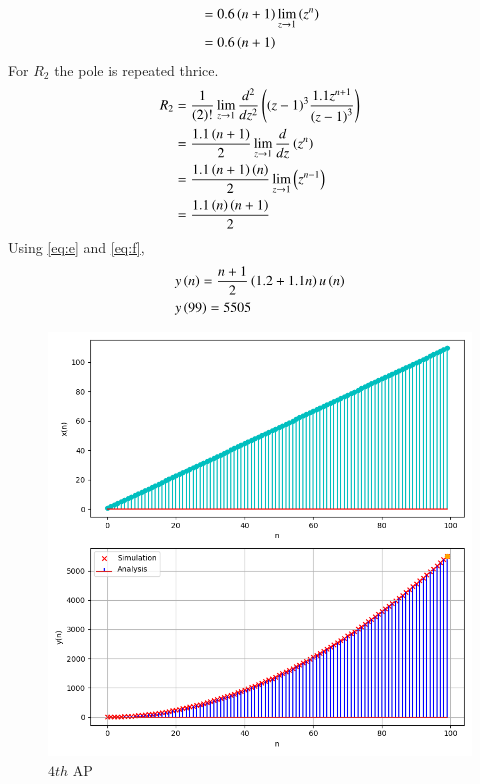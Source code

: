 \documentclass[journal,12pt,twocolumn]{IEEEtran}
\theoremstyle{remark}
\begin{document}
\begin{enumerate}[label=(\alph*)]
\begin{align}
    &=0.6\left(n+1\right)\lim\limits_{z\to 1}\left(z^n\right)\\
    &=0.6\left(n+1\right)\label{eq:e}
\end{align}
    For $R_2$ the pole is repeated thrice.
\begin{align}
    R_2&=\frac{1}{\left(2\right)!}\lim\limits_{z\to 1}\frac{d^{2}}{dz^{2}}\left({\left(z-1\right)}^{3}\frac{1.1z^{n+1}}{{\left(z-1\right)}^3}\right)\\
    &=\frac{1.1\left(n+1\right)}{2}\lim\limits_{z\to 1}\frac{d}{dz}\left(z^n\right)\\
    &=\frac{1.1\left(n+1\right)\left(n\right)}{2}\lim\limits_{z\to 1}\left(z^{n-1}\right)\\
    &=\frac{1.1\left(n\right)\left(n+1\right)}{2}\label{eq:f}
\end{align}
Using \eqref{eq:e} and \eqref{eq:f},
\begin{align}
    &y\left(n\right)=\dfrac{n+1}{2}\left(1.2+1.1n\right)u\left(n\right)\\
    &y\left(99\right)=5505
\end{align}
    \begin{figure}[h!]
        \centering
        \includegraphics[width=\columnwidth]{figs/plt3.png}
        \caption{$4th$ AP}
    \end{figure}


\end{enumerate}
\end{document}
